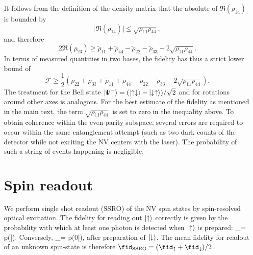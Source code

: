 It follows from the definition of the density matrix that the absolute of $\Re(\rho_{14})$ is bounded by
\begin{equation}
\mid \Re(\rho_{14}) \mid \leq \sqrt{\rho_{11}\rho_{44}},
\end{equation}
and therefore
\begin{equation}
2\Re(\rho_{23}) \geq \tilde{\rho}_{11}+\tilde{\rho}_{44}-\tilde{\rho}_{22}-\tilde{\rho}_{33} - 2\sqrt{\rho_{11}\rho_{44}}.
\end{equation}
In terms of measured quantities in two bases, the fidelity has thus a strict lower bound of\cite{Blinov2004a}
\begin{equation}
\label{eq:fidlowerbound}
\mathcal{F} \geq \frac{1}{2}\left(\rho_{22}+\rho_{33}+\tilde{\rho}_{11}+\tilde{\rho}_{44}-\tilde{\rho}_{22}-\tilde{\rho}_{33} - 2\sqrt{\rho_{11}\rho_{44}}\right).
\end{equation}
The treatment for the Bell state $\left|\Psi^-\right> = (\left|\uparrow\downarrow\right>-\left|\downarrow\uparrow\right>)/\sqrt{2}$ and for rotations around other axes is analogous. For the best estimate of the fidelity as mentioned in the main text, the term $\sqrt{\rho_{11}\rho_{44}}$ is set to zero in the inequality above. To obtain coherence within the even-parity subspace, several errors are required to occur within the same entanglement attempt (such as two dark counts of the detector while not exciting the NV centers with the laser). The probability of such a string of events happening is negligible.



\section{Spin readout}

We perform single shot readout (SSRO) of the NV spin states by spin-resolved optical excitation\cite{Robledo:2011fs}. The fidelity for reading out $\left|\uparrow\right>$ correctly is given by the probability with which at least one photon is detected when $\left|\uparrow\right>$ is prepared:
\be
{}_\uparrow = p(|\uparrow).
\ee
Conversely,
\be
{}_\downarrow = p(0|\downarrow),
\ee
after preparation of $\left|\downarrow\right>$. The mean fidelity for readout of an unknown spin-state is therefore $\fid_\text{SSRO} = (\fid_\uparrow + \fid_\downarrow)/2$.

